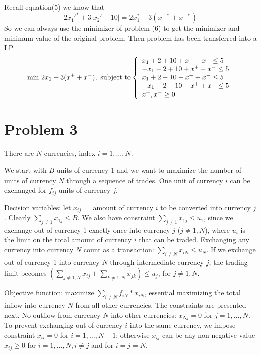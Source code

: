 \documentclass{article}
\begin{document}
Recall equation(5) we know that
\begin{equation}  
2x_1'^*+3|x_2'-10| = 2x_1^*+3(x^{+*}+x^{-*})
\end{equation}  
So we can always use the minimizer of problem (6) to get the minimizer and minimum value of the original problem. Then problem has been transferred into a LP
\begin{equation}  
\min \,2x_1+3(x^++x^-) , \textnormal{ subject to}
\left\{  
             \begin{array}{ll}
             x_1+2+10+x^+-x^-\leq 5\\
             -x_1-2+10+x^+-x^-\leq 5\\
             x_1+2-10-x^++x^-\leq 5\\
             -x_1-2-10-x^++x^-\leq 5\\
             x^+,x^-\geq 0
             \end{array}  
\right.  
\end{equation}  

\section{Problem 3}
\newcommand{\ccy}[1]{currency#1}

There are $N$ currencies, index $i=1,\dots,N$.

We start with $B$ units of currency 1 and we want to maximize the number
of units of currency $N$ through a sequence of trades. One unit of 
currency $i$ can be exchanged for $f_{ij}$ units of currency $j$.

Decision variables: let $x_{ij} =$ amount of currency $i$ to be converted 
into currency $j$. Clearly $\sum_{j\not= 1}x_{1j}\leq B$. We also have 
constraint $\sum_{j\not= 1}x_{1j}\leq u_1$, since we exchange out of 
currency 1 exactly once into currency $j$ ($j \not= 1,N$), 
where $u_i$ is the limit on the total amount of currency $i$ that can be
traded. Exchanging any currency into currency $N$ count as a transaction: 
$\sum_{i\not= N}x_{iN}\leq u_N$.
If we exchange out of currency 1 into currency $N$ through 
intermediate currency $j$, the trading limit becomes
$(\sum_{j \not= 1,N}x_{ij} + \sum_{k \not= 1,N}x_{jk}) \leq u_j$, for $j \not= 1,N$.

Objective function: maximize $\sum_{i \not= N} f_{iN} * x_{iN}$, essential
maximizing the total inflow into currency $N$ from all other currencies.
The constraints are presented next.
No outflow from currency $N$ into other currencies: $x_{Nj}=0$ for $j=1,\dots,N$.
To prevent exchanging out of currency $i$ into the same currency, 
we impose constraint $x_{ii}=0$ for $i=1,\dots,N-1$; otherwise $x_{ij}$ can be
any non-negative value
$x_{ij}\geq 0$ for $i=1,\dots,N, i\not= j$ and for $i=j=N$.
\end{document}
